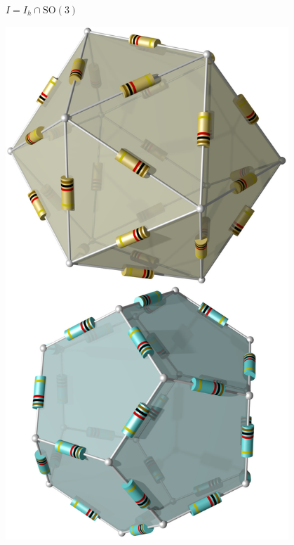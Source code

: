 \begin{frame}[t]
\begin{columns}[t,onlytextwidth]
\begin{column}{0.33\textwidth}
\begin{block}{$I = I_h \cap \operatorname{SO(3)}$}
\begin{center}
\includegraphics[width=0.8\textwidth]{../slides/6/punktgruppen/toi/I.jpg}
\end{center}
\end{block}
\end{column}
\end{columns}
\end{frame}
\egroup
